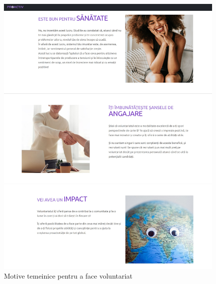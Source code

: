 \documentclass[12pt,a4paper]{report}
\begin{document}
\begin{itemize}
\begin{figure}[H]
  \includegraphics[width=1\linewidth]{./imagini/pp4.jpg}
  \caption{Motive temeinice pentru a face voluntariat}
\end{figure}
\end{itemize}
\end{document}
